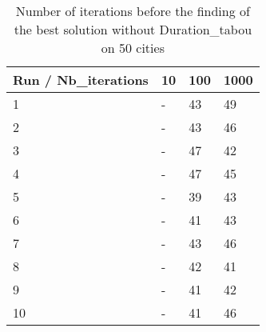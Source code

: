 \documentclass[12pt,oneside,a4paper]{article}
\begin{document}
    \begin{table}[h]
        \centering
        \small
        \begin{tabular}{llll}
          \hline
          \multicolumn{1}{|l|}{\textbf{Run / Nb\_iterations}}& \multicolumn{1}{l|}{\textbf{10}} & \multicolumn{1}{l|}{\textbf{100}} & \multicolumn{1}{l|}{\textbf{1000}}\\ \hline
          \multicolumn{1}{|l|}{1} & \multicolumn{1}{l|}{-}  & \multicolumn{1}{l|}{43}  & \multicolumn{1}{l|}{49}  \\ \hline
          \multicolumn{1}{|l|}{2} & \multicolumn{1}{l|}{-}  & \multicolumn{1}{l|}{43}  & \multicolumn{1}{l|}{46}  \\ \hline         
          \multicolumn{1}{|l|}{3} & \multicolumn{1}{l|}{-}  & \multicolumn{1}{l|}{47}  & \multicolumn{1}{l|}{42}  \\ \hline
          \multicolumn{1}{|l|}{4} & \multicolumn{1}{l|}{-}  & \multicolumn{1}{l|}{47}  & \multicolumn{1}{l|}{45}  \\ \hline
          \multicolumn{1}{|l|}{5} & \multicolumn{1}{l|}{-}  & \multicolumn{1}{l|}{39}  & \multicolumn{1}{l|}{43}  \\ \hline
          \multicolumn{1}{|l|}{6} & \multicolumn{1}{l|}{-}  & \multicolumn{1}{l|}{41}  & \multicolumn{1}{l|}{43}  \\ \hline
          \multicolumn{1}{|l|}{7} & \multicolumn{1}{l|}{-}  & \multicolumn{1}{l|}{43}  & \multicolumn{1}{l|}{46}  \\ \hline
          \multicolumn{1}{|l|}{8} & \multicolumn{1}{l|}{-}  & \multicolumn{1}{l|}{42}  & \multicolumn{1}{l|}{41}  \\ \hline
          \multicolumn{1}{|l|}{9} & \multicolumn{1}{l|}{-}  & \multicolumn{1}{l|}{41}  & \multicolumn{1}{l|}{42}  \\ \hline
          \multicolumn{1}{|l|}{10} & \multicolumn{1}{l|}{-}  & \multicolumn{1}{l|}{41}  & \multicolumn{1}{l|}{46}  \\ \hline
        \end{tabular}
        \caption{Number of iterations before the finding of the best solution without Duration\_tabou on 50 cities}
      \end{table}
\end{document}

